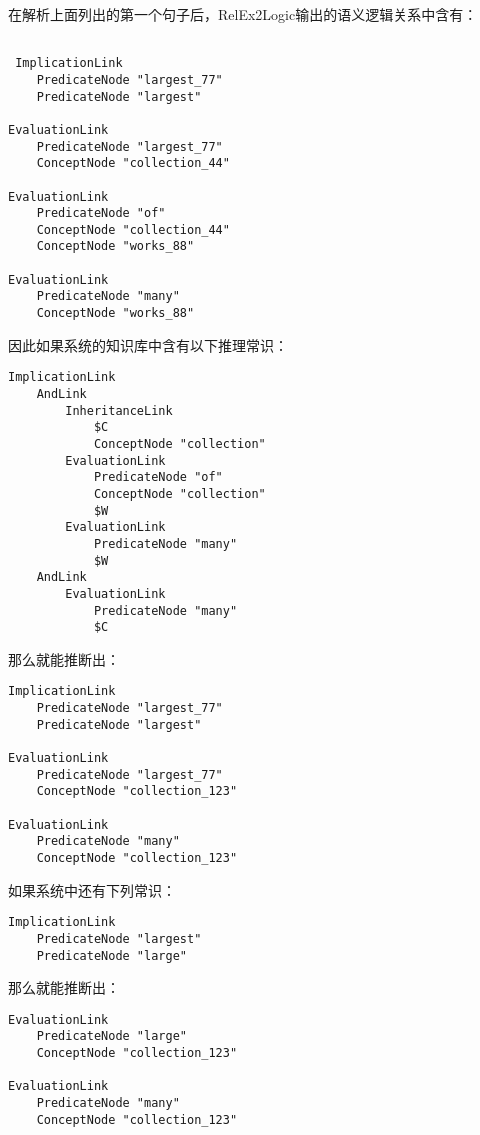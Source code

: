 在解析上面列出的第一个句子后，RelEx2Logic输出的语义逻辑关系中含有：

 {\tt\begin{small}\begin{lstlisting}

 ImplicationLink
 	PredicateNode "largest_77"
	PredicateNode "largest"

EvaluationLink
	PredicateNode "largest_77"
	ConceptNode "collection_44"
	
EvaluationLink
	PredicateNode "of"
	ConceptNode "collection_44"
	ConceptNode "works_88"
	
EvaluationLink
	PredicateNode "many"
	ConceptNode "works_88"
\end{lstlisting}\end{small}}

\noindent 因此如果系统的知识库中含有以下推理常识：

{\tt\begin{small}\begin{lstlisting}
ImplicationLink
	AndLink
		InheritanceLink
			$C
			ConceptNode "collection"
		EvaluationLink
			PredicateNode "of"
			ConceptNode "collection"
			$W
		EvaluationLink
			PredicateNode "many"
			$W
	AndLink
		EvaluationLink
			PredicateNode "many"
			$C
 \end{lstlisting}\end{small}}

\noindent 那么就能推断出：

 {\tt\begin{small}\begin{lstlisting}
ImplicationLink
 	PredicateNode "largest_77"
	PredicateNode "largest"

EvaluationLink
	PredicateNode "largest_77"
	ConceptNode "collection_123"
	
EvaluationLink
	PredicateNode "many"
	ConceptNode "collection_123"
\end{lstlisting}\end{small}}

\noindent 如果系统中还有下列常识：

 {\tt\begin{small}\begin{lstlisting}
ImplicationLink
	PredicateNode "largest"
	PredicateNode "large"
\end{lstlisting}\end{small}}

\noindent 那么就能推断出：

 {\tt\begin{small}\begin{lstlisting}
EvaluationLink
	PredicateNode "large"
	ConceptNode "collection_123"
	
EvaluationLink
	PredicateNode "many"
	ConceptNode "collection_123"
\end{lstlisting}\end{small}}

